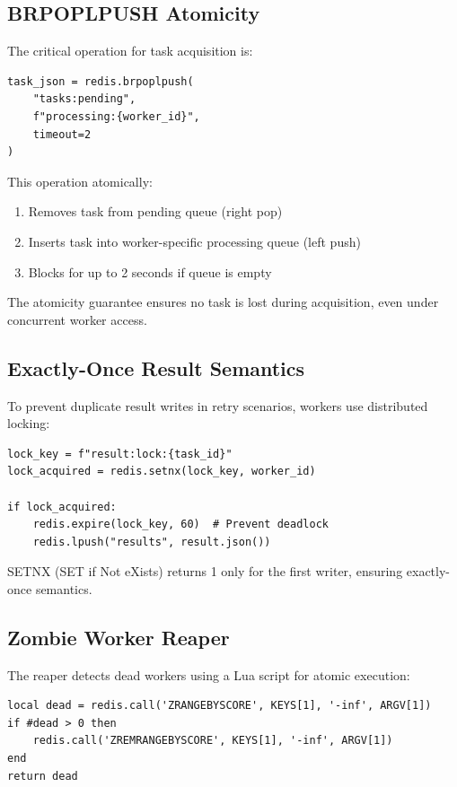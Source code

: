 \documentclass[11pt,a4paper]{article}
\begin{document}
\subsection{BRPOPLPUSH Atomicity}

The critical operation for task acquisition is:

\begin{lstlisting}[style=pythonstyle, caption=Atomic Task Acquisition]
task_json = redis.brpoplpush(
    "tasks:pending",
    f"processing:{worker_id}",
    timeout=2
)
\end{lstlisting}

This operation atomically:
\begin{enumerate}
    \item Removes task from pending queue (right pop)
    \item Inserts task into worker-specific processing queue (left push)
    \item Blocks for up to 2 seconds if queue is empty
\end{enumerate}

The atomicity guarantee ensures no task is lost during acquisition, even under concurrent worker access.

\subsection{Exactly-Once Result Semantics}

To prevent duplicate result writes in retry scenarios, workers use distributed locking:

\begin{lstlisting}[style=pythonstyle, caption=Distributed Lock for Result Writes]
lock_key = f"result:lock:{task_id}"
lock_acquired = redis.setnx(lock_key, worker_id)

if lock_acquired:
    redis.expire(lock_key, 60)  # Prevent deadlock
    redis.lpush("results", result.json())
\end{lstlisting}

SETNX (SET if Not eXists) returns 1 only for the first writer, ensuring exactly-once semantics.

\subsection{Zombie Worker Reaper}

The reaper detects dead workers using a Lua script for atomic execution:

\begin{lstlisting}[style=luastyle, caption=Lua Script for Dead Worker Detection]
local dead = redis.call('ZRANGEBYSCORE', KEYS[1], '-inf', ARGV[1])
if #dead > 0 then
    redis.call('ZREMRANGEBYSCORE', KEYS[1], '-inf', ARGV[1])
end
return dead
\end{lstlisting}
\end{document}
